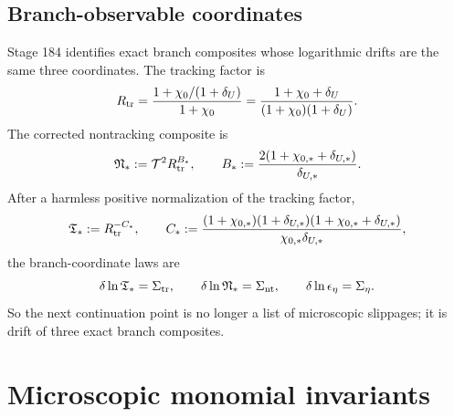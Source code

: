 \subsection{Branch-observable coordinates}
Stage 184 identifies exact branch composites whose logarithmic drifts are the same three coordinates.  The tracking factor is
\begin{equation}
\label{eq:part05-Rtr-def}
R_{\rm tr}
=
\frac{1+\chi_0/(1+\delta_U)}{1+\chi_0}
=
\frac{1+\chi_0+\delta_U}{(1+\chi_0)(1+\delta_U)}.
\end{equation}
The corrected nontracking composite is
\begin{equation}
\label{eq:part05-Nstar-def}
\mathfrak N_*:=\mathcal T^2R_{\rm tr}^{B_*},
\qquad
B_*:=\frac{2(1+\chi_{0,*}+\delta_{U,*})}{\delta_{U,*}}.
\end{equation}
After a harmless positive normalization of the tracking factor,
\begin{equation}
\label{eq:part05-Tstar-def}
\mathfrak T_*:=R_{\rm tr}^{-C_*},
\qquad
C_*:=\frac{(1+\chi_{0,*})(1+\delta_{U,*})(1+\chi_{0,*}+\delta_{U,*})}{\chi_{0,*}\delta_{U,*}},
\end{equation}
the branch-coordinate laws are
\begin{equation}
\label{eq:part05-branch-coordinate-laws}
\delta\ln\mathfrak T_* = \Sigma_{\rm tr},
\qquad
\delta\ln\mathfrak N_* = \Sigma_{\rm nt},
\qquad
\delta\ln\epsilon_\eta=\Sigma_\eta.
\end{equation}
So the next continuation point is no longer a list of microscopic slippages; it is drift of three exact branch composites.


\section{Microscopic monomial invariants}
\label{sec:part05_weak_axisymmetric_orbit:microscopic-monomial-invariants}

